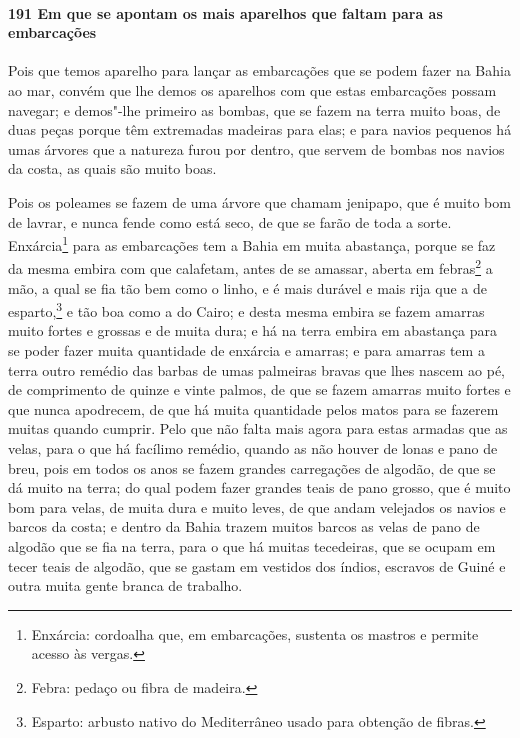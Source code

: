 \begin{linenumbers}
\paragraph{191 Em que se apontam os mais aparelhos que faltam para as embarcações}\quad
Pois que temos aparelho para lançar as embarcações que se podem fazer na Bahia ao mar,
convém que lhe demos os aparelhos com que estas embarcações possam navegar; e demos"-lhe
primeiro as bombas, que se fazem na terra muito boas, de duas peças porque têm extremadas
madeiras para elas; e para navios pequenos há umas árvores que a natureza furou por
dentro, que servem de bombas nos navios da costa, as quais são muito boas.

Pois os poleames se fazem de uma árvore que chamam jenipapo, que é muito bom de lavrar, e
nunca fende como está seco, de que se farão de toda a sorte. Enxárcia\footnote{ Enxárcia:
cordoalha que, em embarcações, sustenta os mastros e permite acesso às vergas.} para as
embarcações tem a Bahia em muita abastança, porque se faz da mesma embira com que
calafetam, antes de se amassar, aberta em febras\footnote{ Febra: pedaço ou fibra de
madeira.} a mão, a qual se fia tão bem como o linho, e é mais durável e mais rija que a de
esparto,\footnote{ Esparto: arbusto nativo do Mediterrâneo usado para obtenção de fibras.}
e tão boa como a do Cairo; e desta mesma embira se fazem amarras muito fortes e grossas e
de muita dura; e há na terra embira em abastança para se poder fazer muita quantidade de
enxárcia e amarras; e para amarras tem a terra outro remédio das barbas de umas palmeiras
bravas que lhes nascem ao pé, de comprimento de quinze e vinte palmos, de que se fazem
amarras muito fortes e que nunca apodrecem, de que há muita quantidade pelos matos para se
fazerem muitas quando cumprir. Pelo que não falta mais agora para estas armadas que as
velas, para o que há facílimo remédio, quando as não houver de lonas e pano de breu, pois
em todos os anos se fazem grandes carregações de algodão, de que se dá muito na terra; do
qual podem fazer grandes teais de pano grosso, que é muito bom para velas, de muita dura e
muito leves, de que andam velejados os navios e barcos da costa; e dentro da Bahia trazem
muitos barcos as velas de pano de algodão que se fia na terra, para o que há muitas
tecedeiras, que se ocupam em tecer teais de algodão, que se gastam em vestidos dos índios,
escravos de Guiné e outra muita gente branca de trabalho.


\end{linenumbers}
